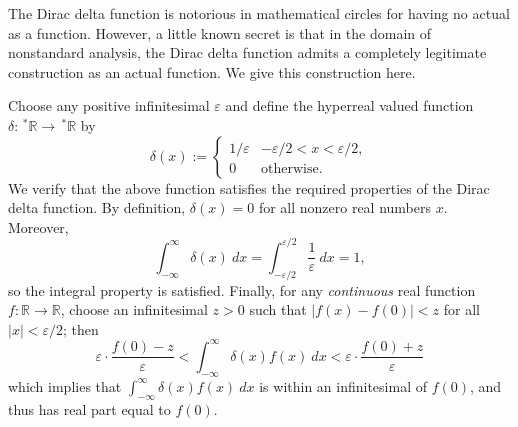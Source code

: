 \documentclass[12pt]{article}
\newcommand{\R}{\mathbb{R}}
\begin{document}
The Dirac delta function is notorious in mathematical circles for having no actual  as a function. However, a little known secret is that in the domain of nonstandard analysis, the Dirac delta function admits a completely legitimate construction as an actual function. We give this construction here.

Choose any positive infinitesimal $\varepsilon$ and define the hyperreal valued function $\delta:\,^*\R \longrightarrow\,^*\R$ by
$$
\delta(x) :=
\begin{cases}
1/\varepsilon & -\varepsilon/2 < x < \varepsilon/2, \\
0 & \text{otherwise.}
\end{cases}
$$
We verify that the above function satisfies the required properties of the Dirac delta function. By definition, $\delta(x) = 0$ for all nonzero real numbers $x$. Moreover,
$$
\int_{-\infty}^\infty \delta(x)\ dx = \int_{-\varepsilon/2}^{\varepsilon/2} \frac{1}{\varepsilon} \ dx = 1,
$$
so the integral property is satisfied. Finally, for any {\em continuous} real function $f: \R \longrightarrow \R$, choose an infinitesimal $z > 0$ such that $|f(x) - f(0)| < z$ for all $|x| < \varepsilon/2$; then
$$
\varepsilon \cdot \frac{f(0) - z}{\varepsilon} < \int_{-\infty}^\infty \delta(x) f(x)\ dx < \varepsilon \cdot \frac{f(0) + z}{\varepsilon}
$$
which implies that $\int_{-\infty}^\infty \delta(x) f(x)\ dx$ is within an infinitesimal of $f(0)$, and thus has real part equal to $f(0)$.
\end{document}

